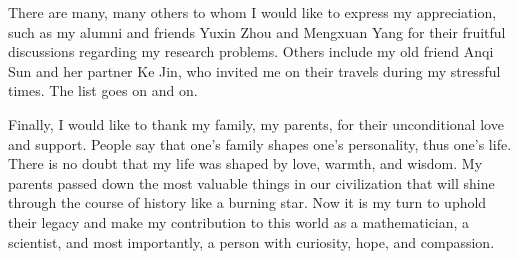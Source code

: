 There are many, many others to whom I would like to express my appreciation, such as my alumni and friends Yuxin Zhou and Mengxuan Yang for their fruitful discussions regarding my research problems. Others include my old friend Anqi Sun and her partner Ke Jin, who invited me on their travels during my stressful times. The list goes on and on.

Finally, I would like to thank my family, my parents, for their unconditional love and support. People say that one's family shapes one's personality, thus one's life. There is no doubt that my life was shaped by love, warmth, and wisdom. My parents passed down the most valuable things in our civilization that will shine through the course of history like a burning star. Now it is my turn to uphold their legacy and make my contribution to this world as a mathematician, a scientist, and most importantly, a person with curiosity, hope, and compassion.